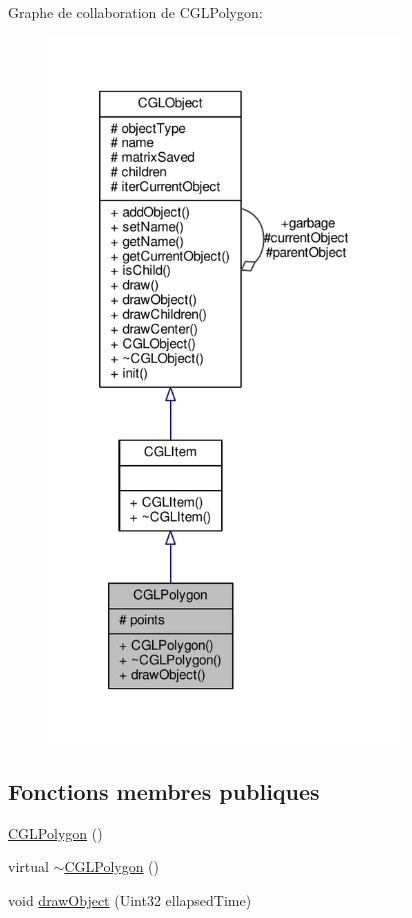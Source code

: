 Graphe de collaboration de C\-G\-L\-Polygon\-:\nopagebreak
\begin{figure}[H]
\begin{center}
\leavevmode
\includegraphics[width=267pt]{d0/d36/class_c_g_l_polygon__coll__graph}
\end{center}
\end{figure}
\subsection*{Fonctions membres publiques}
\begin{DoxyCompactItemize}
\item 
\hyperlink{class_c_g_l_polygon_a7727830b4fa06ad9d4fdd684d03525ab}{C\-G\-L\-Polygon} ()
\item 
virtual \hyperlink{class_c_g_l_polygon_a87b29787eaf2def21bcc61cf5cd0d76c}{$\sim$\-C\-G\-L\-Polygon} ()
\item 
void \hyperlink{class_c_g_l_polygon_a8450b134d7e40059c36ecc43133596c0}{draw\-Object} (Uint32 ellapsed\-Time)
\end{DoxyCompactItemize}

